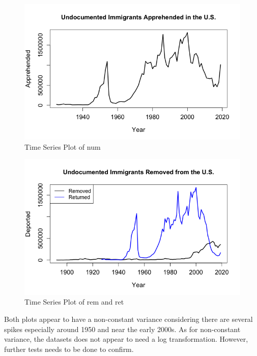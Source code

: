 \documentclass[a4paper]{article}
\begin{document}
\begin{figure}[h!]
\centering
\includegraphics[scale=0.4]{images/ts_apprehended.png}
\caption{Time Series Plot of num}
\label{fig:ts_app}
\end{figure}

\begin{figure}[h!]
\centering
\includegraphics[scale=0.4]{images/ts_deported.png}
\caption{Time Series Plot of rem and ret}
\label{fig:ts_dep}
\end{figure}

Both plots appear to have a non-constant variance considering there are several spikes especially around 1950 and near the early 2000s. As for non-constant variance, the datasets does not appear to need a log transformation. However, further tests needs to be done to confirm.\\
\end{document}
